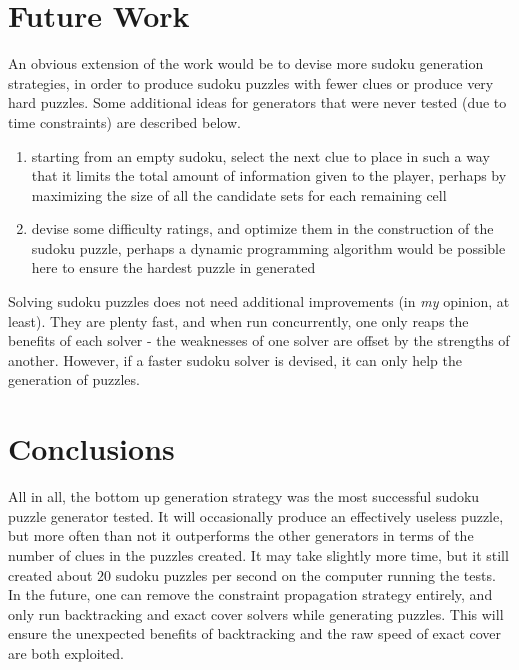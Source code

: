 
\section{Future Work}

An obvious extension of the work would be to devise more sudoku generation strategies, in order to produce sudoku puzzles with
fewer clues or produce very hard puzzles. Some additional ideas for generators that were never tested (due to time constraints)
are described below.

\begin{enumerate}
    \item starting from an empty sudoku, select the next clue to place in such a way that it limits the total amount of
    information given to the player, perhaps by maximizing the size of all the candidate sets for each remaining cell

    \item devise some difficulty ratings, and optimize them in the construction of the sudoku puzzle, perhaps a dynamic programming
    algorithm would be possible here to ensure the hardest puzzle in generated
\end{enumerate}

Solving sudoku puzzles does not need additional improvements (in \textit{my} opinion, at least). They are plenty fast, and when run
concurrently, one only reaps the benefits of each solver - the weaknesses of one solver are offset by the strengths of another.
However, if a faster sudoku solver is devised, it can only help the generation of puzzles.


\clearpage
\section{Conclusions}
All in all, the bottom up generation strategy was the most successful sudoku puzzle generator tested. It will occasionally produce an
effectively useless puzzle, but more often than not it outperforms the other generators in terms of the number of clues in the puzzles
created. It may take slightly more time, but it still created about $20$ sudoku puzzles per second on the computer running the tests.
In the future, one can remove the constraint propagation strategy entirely, and only run backtracking and exact cover solvers while
generating puzzles. This will ensure the unexpected benefits of backtracking and the raw speed of exact cover are both exploited.
